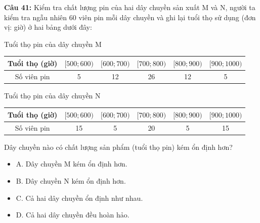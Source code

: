\documentclass[12pt]{article}
\begin{document}
	\vspace{4mm}
	
	\noindent \textbf{Câu 41:} Kiểm tra chất lượng pin của hai dây chuyền sản xuất M và N, người ta kiểm tra ngẫu nhiên 60 viên pin mỗi dây chuyền và ghi lại tuổi thọ sử dụng (đơn vị: giờ) ở hai bảng dưới đây:
	\begin{center}
		Tuổi thọ pin của dây chuyền M
		\renewcommand{\arraystretch}{1.3}
		\begin{tabular}{|c|c|c|c|c|c|}
			\hline
			Tuổi thọ (giờ) & $[500; 600)$ & $[600; 700)$ & $[700; 800)$ & $[800; 900)$ & $[900; 1000)$ \\
			\hline
			Số viên pin & 5 & 12 & 26 & 12 & 5 \\
			\hline
		\end{tabular}
	\end{center}
	\begin{center}
		Tuổi thọ pin của dây chuyền N
		\renewcommand{\arraystretch}{1.3}
		\begin{tabular}{|c|c|c|c|c|c|}
			\hline
			Tuổi thọ (giờ) & $[500; 600)$ & $[600; 700)$ & $[700; 800)$ & $[800; 900)$ & $[900; 1000)$ \\
			\hline
			Số viên pin & 15 & 5 & 20 & 5 & 15 \\
			\hline
		\end{tabular}
	\end{center}
	Dây chuyền nào có chất lượng sản phẩm (tuổi thọ pin) kém ổn định hơn?
	\begin{itemize}[label=, leftmargin=*]
		\item A. Dây chuyền M kém ổn định hơn.
		\item B. Dây chuyền N kém ổn định hơn.
		\item C. Cả hai dây chuyền ổn định như nhau.
		\item D. Cả hai dây chuyền đều hoàn hảo.
	\end{itemize}
	
	\vspace{4mm}
	
\end{document}
